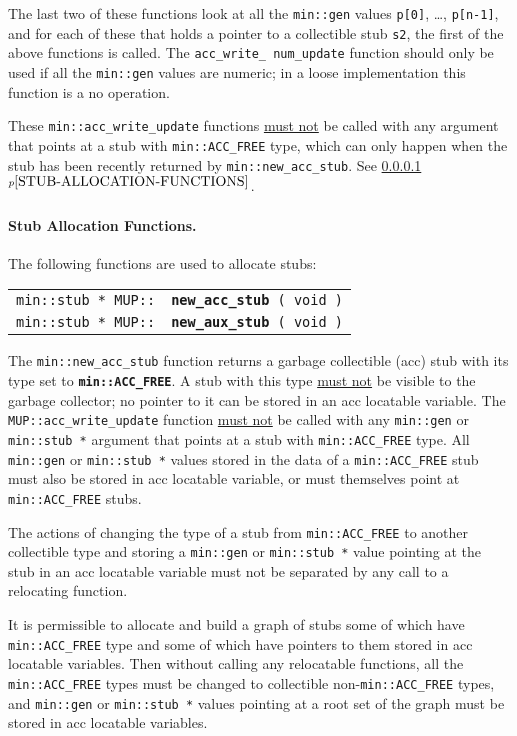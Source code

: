 \documentclass[12pt]{article}
\makeatletter
\newcommand{\subsubsubsection}[1]{\paragraph[#1]{#1.}}
\newcommand{\ttindex}[1]{\index{#1@{\tt #1}}}
\newcommand{\minkey}[1]%
           {{\tt \bf min::#1}\ttindex{min::#1}\ttindex{#1}}
\newcommand{\MUPindex}[1]{\ttindex{MUP::#1}\ttindex{#1}}
\newcommand{\itemref}[1]{\ref{#1}$^{p\pageref{#1}}$}
\newcommand{\EOL}{\penalty \exhyphenpenalty}
\newenvironment{indpar}[1][0.3in]%
	{\begin{list}{}%
		     {\setlength{\itemsep}{0in}%
		      \setlength{\topsep}{0in}%
		      \setlength{\parsep}{1ex}%
		      \setlength{\labelwidth}{#1}%
		      \setlength{\leftmargin}{#1}%
		      \addtolength{\leftmargin}{\labelsep}}%
	 \item}%
	{\end{list}}
\newcommand{\LABEL}[1]{\label{#1}}
\newcommand{\MUPKEY}[1]{{\tt \bf #1}\MUPindex{#1}}
\makeatother
\begin{document}
The last two of these functions look at all the \verb|min::gen|
values \verb|p[0]|, \ldots, \verb|p[n-1]|, and for each of these
that holds a pointer to a collectible stub \verb|s2|, the first of
the above functions is called.  The {\tt acc\_\EOL write\_\EOL
num\_\EOL update} function should only be used if all the
\verb|min::gen| values are numeric; in a loose implementation this
function is a no operation.

These \verb|min::acc_write_update| functions
\underline{must not} be called with any argument that points at a stub
with {\tt min::ACC\_\EOL FREE} type, which can only happen when the
stub has been recently returned by
{\tt min::\EOL new\_\EOL acc\_\EOL stub}.
See \itemref{STUB-ALLOCATION-FUNCTIONS}.


\subsubsubsection{Stub Allocation Functions}
\label{STUB-ALLOCATION-FUNCTIONS}

The following functions are used to allocate stubs:

\begin{indpar}\begin{tabular}{r@{}l}
\verb|min::stub * MUP::| & \MUPKEY{new\_acc\_stub}\verb| ( void )|
\LABEL{MUP::NEW_ACC_STUB} \\
\verb|min::stub * MUP::| & \MUPKEY{new\_aux\_stub}\verb| ( void )|
\LABEL{MUP::NEW_AUX_STUB} \\
\end{tabular}\end{indpar}

The \verb|min::new_acc_stub| function returns a garbage collectible (acc)
stub with its type set to \minkey{ACC\_FREE}.  A stub with this type
\underline{must not} be visible to the garbage collector; no pointer
to it can be stored in an acc locatable variable.
The {\tt MUP::acc\_\EOL write\_\EOL update}
function \underline{must not} be called with any
\verb|min::gen| or {\tt min::\EOL stub~*} argument that points at
a stub with {\tt min::ACC\_\EOL FREE} type.  All
\verb|min::gen| or {\tt min::\EOL stub~*} values stored in
the data of a {\tt min::ACC\_\EOL FREE} stub must also be stored
in acc locatable variable, or must themselves point at 
{\tt min::ACC\_\EOL FREE} stubs.

The actions of changing the type of a stub
from {\tt min::ACC\_\EOL FREE}
to another collectible type and storing a
\verb|min::gen| or {\tt min::\EOL stub~*}
value pointing at the stub in an acc
locatable variable must not be separated by any
call to a relocating function.

It is permissible to allocate and build a graph of stubs some of
which have {\tt min::ACC\_\EOL FREE} type and some of which have
pointers to them stored in acc locatable variables.
Then without calling any relocatable functions, all the
{\tt min::ACC\_\EOL FREE} types must be changed to collectible
non-{\tt min::ACC\_\EOL FREE} types, and
\verb|min::gen| or {\tt min::\EOL stub~*}
values pointing at a root set of the graph must be
stored in acc locatable variables.
\end{document}
